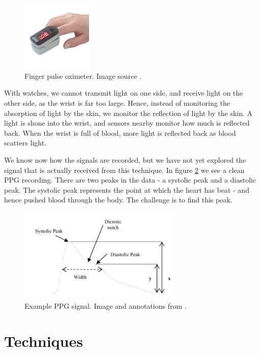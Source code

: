 \documentclass[12pt,a4paper,twoside,openany]{report}
\begin{document}
\begin{figure}[h!]
	\centerline{\includegraphics[width=0.3\textwidth]{figs/fingerppg.jpg}}
	\caption{Finger pulse oximeter. Image source \cite{wiki:fingerppg}.}
\label{fig:fingerppg}
\end{figure}

With watches, we cannot transmit light on one side, and
receive light on the other side, as the wrist is far too large. Hence, instead
of monitoring the absorption of light by the skin, we monitor the reflection
of light by the skin. A light is shone into the wrist, and sensors nearby
monitor how much is reflected back. When the wrist is full of blood, more
light is reflected back as blood scatters light.

We know now how the signals are recorded, but we have not yet explored the
signal that is actually received from this technique. In figure
\ref{fig:typicalppgsignal} we see a
clean PPG recording. There are two peaks in the data - a systolic peak and a
diastolic peak. The systolic peak represents the point at which the heart has
beat - and hence pushed blood through the body. The challenge is to find this
peak.

\begin{figure}[h!]
	\centerline{\includegraphics[width=0.7\textwidth]{figs/typicalppgsignal.jpeg}}
	\caption{Example PPG signal. Image and annotations from \cite{elgendi12}.}
\label{fig:typicalppgsignal}
\end{figure}

\section{Techniques}
\end{document}
